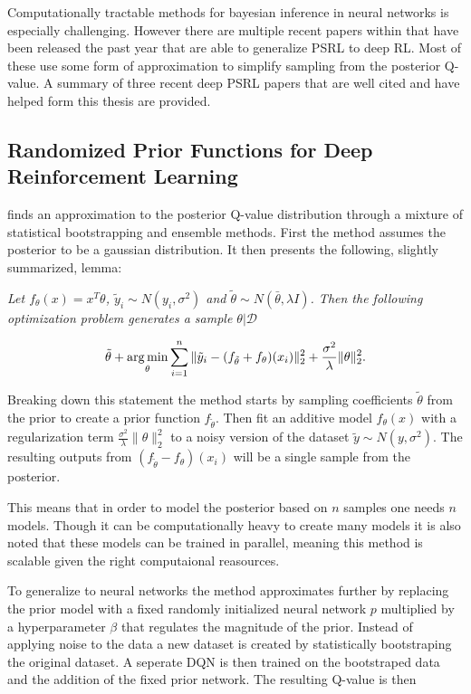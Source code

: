Computationally tractable methods for bayesian inference in neural networks is especially challenging. However there are multiple recent papers within that have been released the past year that are able to generalize PSRL to deep RL. Most of these use some form of approximation to simplify sampling from the posterior Q-value. A summary of three recent deep PSRL papers that are well cited and have helped form this thesis are provided.

\subsection{Randomized Prior Functions for Deep Reinforcement Learning}

\cite{osband_2018} finds an approximation to the posterior Q-value distribution through a mixture of statistical bootstrapping and ensemble methods. First the method assumes the posterior to be a gaussian distribution. It then presents the following, slightly summarized, lemma:


\textit{Let $f_\theta (x) = x^T\theta$, $\tilde{y}_i\sim N(y_i,\sigma^2)$ and $\tilde{\theta} \sim N(\bar{\theta}, \lambda I)$. Then the following optimization problem generates a sample $\theta | \mathcal{D}$}

\begin{equation}
    \tilde{\theta} + \operatorname*{arg\,min}_\theta \sum_{i=1}^n\|\tilde{y}_i-(f_{\tilde{\theta}} + f_\theta)(x_i)\|_2^2 + \frac{\sigma^2}{\lambda}\|\theta\|_2^2.
\end{equation}

Breaking down this statement the method starts by sampling coefficients $\tilde{\theta}$ from the prior to create a prior function $f_{\tilde{\theta}}$. Then fit an additive model $f_\theta(x)$ with a regularization term $\frac{\sigma^2}{\lambda}\|\theta\|_2^2$ to a noisy version of the dataset $\tilde{y} \sim N(y, \sigma^2)$. The resulting outputs from $(f_{\tilde{\theta}}-f_{\theta})(x_i)$ will be a single sample from the posterior. 

This means that in order to model the posterior based on $n$ samples one needs $n$ models. Though it can be computationally heavy to create many models it is also noted that these models can be trained in parallel, meaning this method is scalable given the right computaional reasources.

To generalize to neural networks the method approximates further by replacing the prior model with a fixed randomly initialized neural network $p$ multiplied by a hyperparameter $\beta$ that regulates the magnitude of the prior. Instead of applying noise to the data a new dataset is created by statistically bootstraping the original dataset. A seperate DQN is then trained on the bootstraped data and the addition of the fixed prior network. The resulting Q-value is then 

